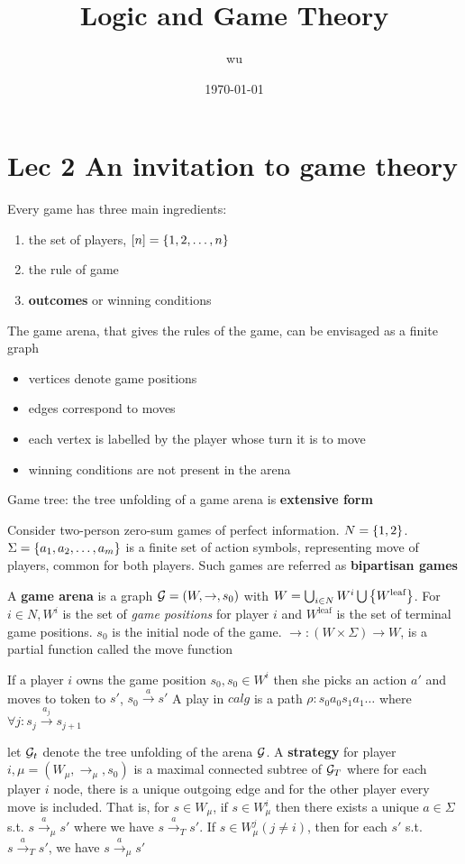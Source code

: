 \documentclass[11pt]{article}
\author{wu}
\date{\today}
\title{Logic and Game Theory}
\begin{document}
\maketitle
\tableofcontents


\section{Lec 2 An invitation to game theory}
\label{sec:org7036d3b}
Every game has three main ingredients:
\begin{enumerate}
\item the set of players, \([n]=\left\{ 1,2,\dots,n\right\}\)
\item the rule of game
\item \textbf{outcomes} or winning conditions
\end{enumerate}


The game arena, that gives the rules of the game, can be envisaged as a finite
graph
\begin{itemize}
\item vertices denote game positions
\item edges correspond to moves
\item each vertex is labelled by the player whose turn it is to move
\item winning conditions are not present in the arena
\end{itemize}


Game tree: the tree unfolding of a game arena is \textbf{extensive form}


Consider two-person zero-sum games of perfect information. \(N=\left\{ 1,2\right\}\).
\(\Sigma=\left\{ a_1,a_2,\dots,a_m\right\}\) is a finite set of action symbols,
representing move of players, common for both players. Such games are referred
as \textbf{bipartisan games}


A \textbf{game arena} is a graph 
\(\mathcal{G}=(W,\to,s_0)\) with \(W=\bigcup_{i\in N}W^i\bigcup\left\{ W^\text{leaf}\right\}\). For
\(i\in N, W^i\) is the set of \emph{game positions} for player \(i\) and \(W^\text{leaf}\)
is the set of terminal game positions. \(s_0\) is the initial node of the game.
\(\to:(W\times \Sigma)\to W\), is a partial function called the move function


If a player \(i\) owns the game position \(s_0, s_0\in W^i\) then she picks an
action \(a'\) and moves to token to \(s'\), \(s_0\xrightarrow{a} s'\)
A play in \(calg\) is a path \(\rho:s_0a_0s_1a_1\dots\) where 
\(\forall j:s_j\xrightarrow{a_j}s_{j+1}\)


let \(\mathcal{G}_t\) denote the tree unfolding of the arena \(\mathcal{G}\). A \textbf{strategy} for
player \(i,\mu=(W_\mu,\to_\mu,s_0)\) is a maximal connected subtree of \(\mathcal{G}_T\)
where for each player \(i\) node, there is a unique outgoing edge and for the
other player every move is included. That is, for \(s\in W_\mu\), if \(s\in
  W^i_\mu\) then there exists a unique \(a\in\Sigma\) s.t. \(s\xrightarrow{a}_\mu
  s'\) where we have \(s\xrightarrow{a}_T s'\). If \(s\in W_\mu^j(j\neq i)\), then
for each \(s'\) s.t. \(s\xrightarrow{a}_Ts'\), we have \(s\xrightarrow{a}_\mu s'\) 
\end{document}

